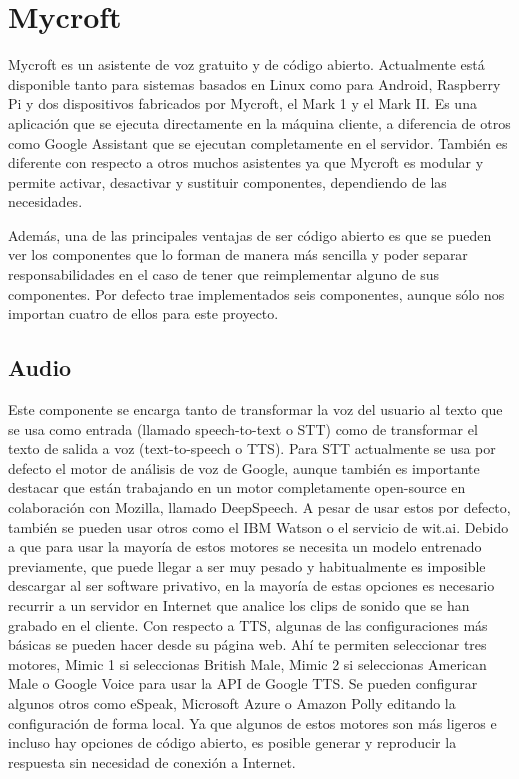 \section{Mycroft}
Mycroft es un asistente de voz gratuito y de código abierto. Actualmente está disponible tanto para sistemas basados en Linux como para Android, Raspberry Pi y dos dispositivos fabricados por Mycroft, el Mark 1 y el Mark II.
Es una aplicación que se ejecuta directamente en la máquina cliente, a diferencia de otros como Google Assistant que se ejecutan completamente en el servidor. También es diferente con respecto a otros muchos asistentes ya que Mycroft es modular y permite activar, desactivar y sustituir componentes, dependiendo de las necesidades.

Además, una de las principales ventajas de ser código abierto es que se pueden ver los componentes que lo forman de manera más sencilla y poder separar responsabilidades en el caso de tener que reimplementar alguno de sus componentes. Por defecto trae implementados seis componentes, aunque sólo nos importan cuatro de ellos para este proyecto.
\subsection{Audio}
Este componente se encarga tanto de transformar la voz del usuario al texto que se usa como entrada (llamado speech-to-text o STT) como de transformar el texto de salida a voz (text-to-speech o TTS).
Para STT actualmente se usa por defecto el motor de análisis de voz de Google, aunque también es importante destacar que están trabajando en un motor completamente open-source en colaboración con Mozilla, llamado DeepSpeech. A pesar de usar estos por defecto, también se pueden usar otros como el IBM Watson o el servicio de wit.ai. Debido a que para usar la mayoría de estos motores se necesita un modelo entrenado previamente, que puede llegar a ser muy pesado y habitualmente es imposible descargar al ser software privativo, en la mayoría de estas opciones es necesario recurrir a un servidor en Internet que analice los clips de sonido que se han grabado en el cliente.
Con respecto a TTS, algunas de las configuraciones más básicas se pueden hacer desde su página web. Ahí te permiten seleccionar tres motores, Mimic 1 si seleccionas British Male, Mimic 2 si seleccionas American Male o Google Voice para usar la API de Google TTS. Se pueden configurar algunos otros como eSpeak, Microsoft Azure o Amazon Polly editando la configuración de forma local. Ya que algunos de estos motores son más ligeros e incluso hay opciones de código abierto, es posible generar y reproducir la respuesta sin necesidad de conexión a Internet.
